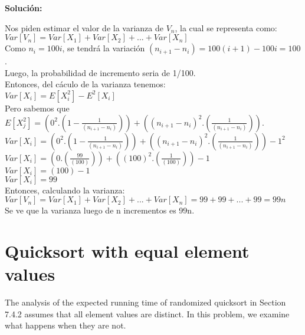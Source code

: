\documentclass{article}
\begin{document}
\begin{enumerate}[label=(\alph*)]
  \textbf{Solución:}
  
  Nos piden estimar el valor de la varianza de $V_n$, la cual se representa como:\\
  $Var[V_n] = Var[X_1] + Var[X_2] + ... + Var[X_n] $\\
  
  Como $n_i = 100i$, se tendrá la variación $(n_{i+1}-n_i) = 100(i+1) - 100i = 100$.\\
  Luego, la probabilidad de incremento seria de 1/100.\\
  
  Entonces, del cáculo de la varianza tenemos:\\
  
  $Var[X_i] =  E[X_i^2] - E^2[X_i]$\\
  Pero sabemos que $E[X_j^2] = (0^2. (1-\frac{1}{(n_{i+1}-n_i)})) + ((n_{i+1}-n_i)^2. (\frac{1}{(n_{i+1}-n_i)}))$.\\
  $Var[X_i] =  (0^2. (1-\frac{1}{(n_{i+1}-n_i)})) + ((n_{i+1}-n_i)^2. (\frac{1}{(n_{i+1}-n_i)})) - 1^2$\\
  $Var[X_i] =  (0. (\frac{99}{(100)})) + ((100)^2. (\frac{1}{(100)})) - 1$\\
  $Var[X_i] =  (100) - 1$\\
  $Var[X_i] =  99$\\
  Entonces, calculando la varianza:\\
  $Var[V_n] = Var[X_1] + Var[X_2] + ... + Var[X_n]= 99+ 99 + ...+ 99 = 99n$\\
  
  Se ve que la varianza luego de n incrementos es 99n.
  
\end{enumerate}


\section{Quicksort with equal element values}
The analysis of the expected running time of randomized quicksort in Section 7.4.2 assumes that all element values are distinct. In this problem, we examine what happens when they are not.
\end{document}
